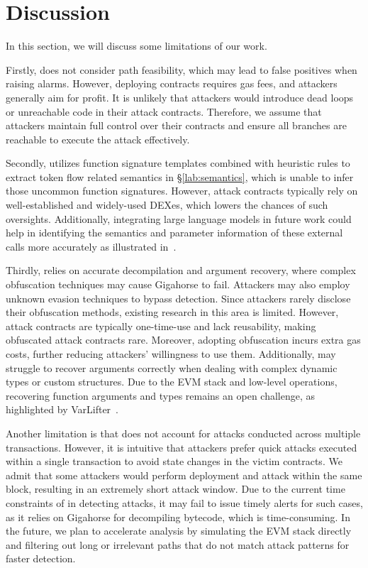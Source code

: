 \section{Discussion}
\label{sec:discuss}

In this section, we will discuss some limitations of our work.


Firstly, {\tool} does not consider path feasibility, which may lead to false positives when raising alarms.
However, deploying contracts requires gas fees, and attackers generally aim for profit. It is unlikely that attackers would introduce dead loops or unreachable code in their attack contracts. Therefore, we assume that attackers maintain full control over their contracts and ensure all branches are reachable to execute the attack effectively.

Secondly, {\tool} utilizes function signature templates combined with heuristic rules to extract token flow related semantics in \S\ref{lab:semantics}, which is unable to infer those uncommon function signatures. However, attack contracts typically rely on well-established and widely-used DEXes, which lowers the chances of such oversights. Additionally, integrating large language models in future work could help in identifying the semantics and parameter information of these external calls more accurately as illustrated in~\cite{wang2024smartinv}.

Thirdly, {\tool} relies on accurate decompilation and argument recovery, where complex obfuscation techniques may cause Gigahorse to fail. Attackers may also employ unknown evasion techniques to bypass detection. Since attackers rarely disclose their obfuscation methods, existing research in this area is limited. However, attack contracts are typically one-time-use and lack reusability, making obfuscated attack contracts rare. Moreover, adopting obfuscation incurs extra gas costs, further reducing attackers' willingness to use them. Additionally, {\tool} may struggle to recover arguments correctly when dealing with complex dynamic types or custom structures. Due to the EVM stack and low-level operations, recovering function arguments and types remains an open challenge, as highlighted by VarLifter~\cite{li2024varlifter}.

Another limitation is that {\tool} does not account for attacks conducted across multiple transactions. However, it is intuitive that attackers prefer quick attacks executed within a single transaction to avoid state changes in the victim contracts.
We admit that some attackers would perform deployment and attack within the same block, resulting in an extremely short attack window. Due to the current time constraints of {\tool} in detecting attacks, it may fail to issue timely alerts for such cases, as it relies on Gigahorse for decompiling bytecode, which is time-consuming. 
In the future, we plan to accelerate analysis by simulating the EVM stack directly and filtering out long or irrelevant paths that do not match attack patterns for faster detection.


